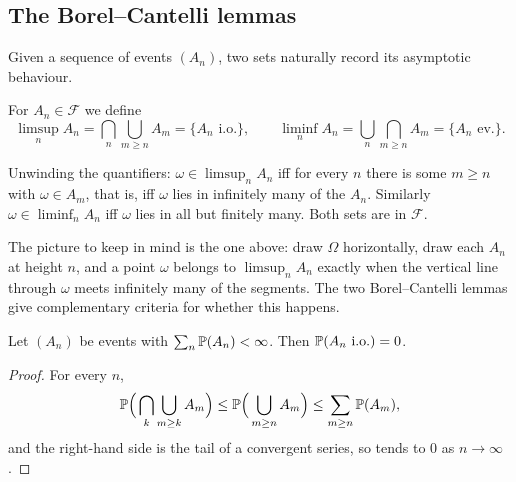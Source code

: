 \documentclass[a4paper]{scrartcl}
\newcommand{\cF}{\mathcal{F}}
\begin{document}
\subsection{The Borel--Cantelli lemmas}

Given a sequence of events $(A_n)$, two sets naturally record its asymptotic behaviour.

\begin{definition}
	For $A_n \in \cF$ we define
	$$
	\limsup_n A_n = \bigcap_{n} \bigcup_{m \geq n} A_m = \{A_n \text{ i.o.}\},\qquad
	\liminf_n A_n = \bigcup_n \bigcap_{m\geq n} A_m = \{A_n \text{ ev.}\}.
	$$
\end{definition}

Unwinding the quantifiers: $\omega \in \limsup_n A_n$ iff for every $n$ there is some $m \geq n$ with $\omega \in A_m$, that is, iff $\omega$ lies in infinitely many of the $A_n$. Similarly $\omega \in \liminf_n A_n$ iff $\omega$ lies in all but finitely many. Both sets are in $\cF$.

\begin{center}
\end{center}

The picture to keep in mind is the one above: draw $\Omega$ horizontally, draw each $A_n$ at height $n$, and a point $\omega$ belongs to $\limsup_n A_n$ exactly when the vertical line through $\omega$ meets infinitely many of the segments. The two Borel--Cantelli lemmas give complementary criteria for whether this happens.

\begin{lemma}\label{lem:bc1}
	Let $(A_n)$ be events with $\sum_n \mathbb{P}(A_n) < \infty$. Then $\mathbb{P}(A_n \text{ i.o.}) = 0$.
\end{lemma}
\begin{proof}
	For every $n$,
	$$
	\mathbb{P}\Big( \bigcap_{k} \bigcup_{m\geq k} A_m \Big) \leq \mathbb{P}\Big( \bigcup_{m \geq n} A_m \Big) \leq \sum_{m\geq n} \mathbb{P}(A_m),
	$$
	and the right-hand side is the tail of a convergent series, so tends to $0$ as $n \to \infty$.
\end{proof}
\end{document}

